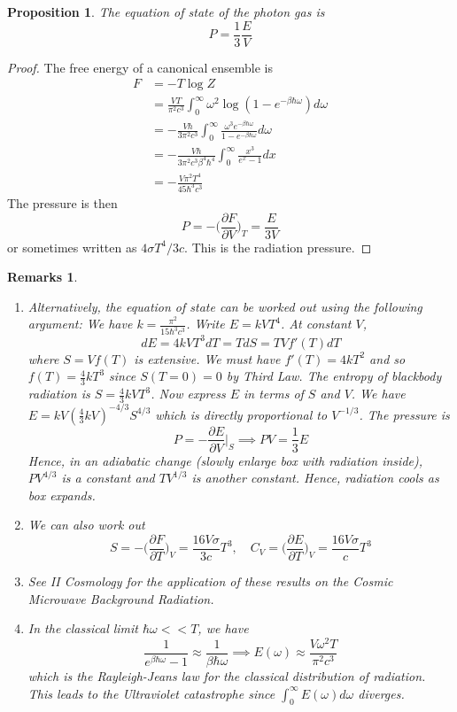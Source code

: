 \documentclass[a4paper]{article}
\newtheorem{remarks}{Remarks}[section]
\theoremstyle{new}
\newtheorem{prop}{Proposition}[section]
\begin{document}
\begin{prop}
The equation of state of the photon gas is
$$P=\frac{1}{3}\frac{E}{V}$$
\end{prop}
\begin{proof}
The free energy of a canonical ensemble is
\begin{align}
F&=-T\log Z\nonumber\\&=\frac{VT}{\pi^2c^3}\int_0^\infty\omega^2\log(1-e^{-\beta\hbar\omega})d\omega\nonumber\\&=-\frac{V\hbar}{3\pi^2c^3}\int_0^\infty\frac{\omega^3e^{-\beta\hbar\omega}}{1-e^{-\beta\hbar\omega}}d\omega\nonumber\\&=-\frac{V\hbar}{3\pi^2c^3\beta^4\hbar^4}\int_0^\infty\frac{x^3}{e^x-1}dx\nonumber\\&=-\frac{V\pi^2T^4}{45\hbar^3c^3}\nonumber
\end{align}
The pressure is then
$$P=-\bigg(\frac{\partial F}{\partial V}\bigg)_T=\frac{E}{3V}$$
or sometimes written as $4\sigma T^4/3c$. This is the radiation pressure. 
\end{proof}
\begin{remarks}\leavevmode
\begin{enumerate}
\item Alternatively, the equation of state can be worked out using the following argument: We have $k=\frac{\pi^2}{15\hbar^3c^3}$. Write $E=kVT^4$. At constant $V$,
$$dE=4kVT^3dT=TdS=TVf'(T)dT$$
where $S=Vf(T)$ is extensive. We must have $f'(T)=4kT^2$ and so $f(T)=\frac{4}{3}kT^3$ since $S(T=0)=0$ by Third Law. The entropy of blackbody radiation is $S=\frac{4}{3}kVT^3$. Now express $E$ in terms of $S$ and $V$. We have $E=kV(\frac{4}{3}kV)^{-4/3}S^{4/3}$ which is directly proportional to $V^{-1/3}$. The pressure is 
$$P=-\frac{\partial E}{\partial V}\bigg|_S\implies PV=\frac{1}{3}E$$
Hence, in an adiabatic change (slowly enlarge box with radiation inside), $PV^{4/3}$ is a constant and $TV^{1/3}$ is another constant. Hence, radiation cools as box expands.
\item We can also work out
$$S=-\bigg(\frac{\partial F}{\partial T}\bigg)_V=\frac{16V\sigma}{3c}T^3,\quad C_V=\bigg(\frac{\partial E}{\partial T}\bigg)_V=\frac{16V\sigma}{c}T^3$$
\item See II Cosmology for the application of these results on the Cosmic Microwave Background Radiation.
\item In the classical limit $\hbar\omega<<T$, we have
$$\frac{1}{e^{\beta\hbar\omega}-1}\approx\frac{1}{\beta\hbar\omega}\implies E(\omega)\approx\frac{V\omega^2T}{\pi^2c^3}$$
which is the Rayleigh-Jeans law for the classical distribution of radiation. This leads to the Ultraviolet catastrophe since $\int_0^\infty E(\omega)d\omega$ diverges.
\end{enumerate}
\end{remarks}
\end{document}
